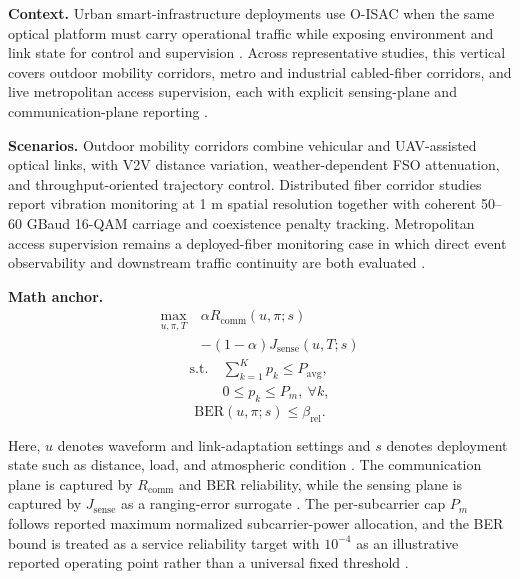 \documentclass[lettersize,journal]{IEEEtran}
\begin{document}
\textbf{Context.} Urban smart-infrastructure deployments use O-ISAC when the same optical platform must carry operational traffic while exposing environment and link state for control and supervision \cite{O_ISAC_003,O_ISAC_005,O_ISAC_276}. Across representative studies, this vertical covers outdoor mobility corridors, metro and industrial cabled-fiber corridors, and live metropolitan access supervision, each with explicit sensing-plane and communication-plane reporting \cite{O_ISAC_003,O_ISAC_038,O_ISAC_064,O_ISAC_276}.

\textbf{Scenarios.} Outdoor mobility corridors combine vehicular and UAV-assisted optical links, with V2V distance variation, weather-dependent FSO attenuation, and throughput-oriented trajectory control. Distributed fiber corridor studies report vibration monitoring at 1 m spatial resolution together with coherent 50--60 GBaud 16-QAM carriage and coexistence penalty tracking. Metropolitan access supervision remains a deployed-fiber monitoring case in which direct event observability and downstream traffic continuity are both evaluated \cite{O_ISAC_003,O_ISAC_005,O_ISAC_038,O_ISAC_074,O_ISAC_064,O_ISAC_276}.

\textbf{Math anchor.}
\begin{equation}
\begin{split}
\max_{u,\pi,T}\ &\alpha R_{\mathrm{comm}}(u,\pi;s) \\
&- (1-\alpha) J_{\mathrm{sense}}(u,T;s)
\end{split}
\end{equation}
\begin{equation}
\begin{split}
\text{s.t.}\ &\sum_{k=1}^{K} p_k \le P_{\mathrm{avg}},\\
&0 \le p_k \le P_m,\ \forall k,
\end{split}
\end{equation}
\begin{equation}
\mathrm{BER}(u,\pi;s) \le \beta_{\mathrm{rel}}.
\end{equation}

Here, $u$ denotes waveform and link-adaptation settings and $s$ denotes deployment state such as distance, load, and atmospheric condition \cite{O_ISAC_034,O_ISAC_048}. The communication plane is captured by $R_{\mathrm{comm}}$ and BER reliability, while the sensing plane is captured by $J_{\mathrm{sense}}$ as a ranging-error surrogate \cite{O_ISAC_034,O_ISAC_048}. The per-subcarrier cap $P_m$ follows reported maximum normalized subcarrier-power allocation, and the BER bound is treated as a service reliability target with $10^{-4}$ as an illustrative reported operating point rather than a universal fixed threshold \cite{O_ISAC_034,O_ISAC_048}.
\end{document}
